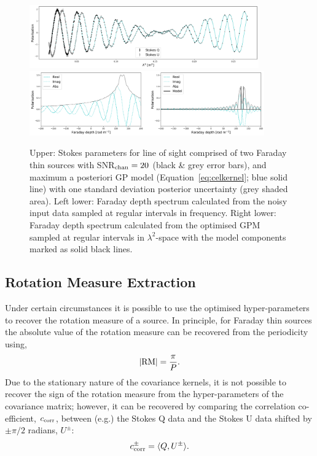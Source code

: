 \documentclass[fleqn,usenatbib]{mnras}
\begin{document}
\begin{figure}
\includegraphics[width=0.88\textwidth]{./FIGURES/double_qu.png}
\includegraphics[width=0.9\textwidth]{./FIGURES/diff_double.png}
\caption{\label{fig:double} Upper: Stokes parameters for line of sight comprised of two Faraday thin sources with SNR$_{\rm chan}=20$ (black \& grey error bars), and maximum a posteriori GP model (Equation~\ref{eq:celkernel}; blue solid line) with one standard deviation posterior uncertainty (grey shaded area). Left lower: Faraday depth spectrum calculated from the noisy input data sampled at regular intervals in frequency. Right lower: Faraday depth spectrum calculated from the optimised GPM sampled at regular intervals in $\lambda^2$-space with the model components marked as solid black lines.}
\end{figure}

 \subsection{Rotation Measure Extraction}
\label{sec:rms}

Under certain circumstances it is possible to use the optimised hyper-parameters to recover the rotation measure of a source. In principle, for Faraday thin sources the absolute value of the rotation measure can be recovered from the periodicity using,
%
\begin{equation}
|{\rm RM}| = \frac{\pi}{P}.
\end{equation}
%
Due to the stationary nature of the covariance kernels, it is not possible to recover the sign of the rotation measure from the hyper-parameters of the covariance matrix; however, it can be recovered by comparing the correlation co-efficient, $c_{\rm corr}$, between (e.g.) the Stokes Q data and the Stokes U data shifted by $\pm\pi/2$ radians, $U^{\pm}$:
%
\begin{equation}
\label{eq:corr}
c_{\rm corr}^{\pm} = \langle Q,U^{\pm} \rangle.
\end{equation}
\end{document}
